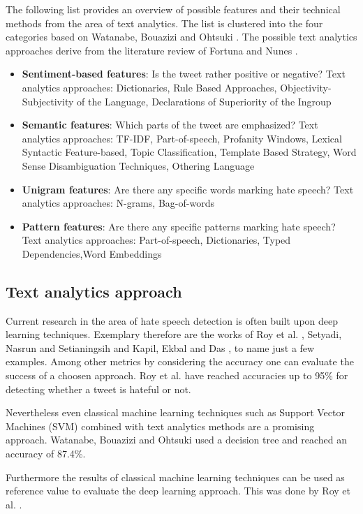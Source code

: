 The following list provides an overview of possible features and their technical methods from the area of text analytics. The list is clustered into the four categories based on Watanabe, Bouazizi and Ohtsuki \cite{Watanabe.2018}. The possible text analytics approaches derive from the literature review of Fortuna and Nunes \cite{Fortuna.2018}.
\begin{itemize}
	\item \textbf{Sentiment-based features}: Is the tweet rather positive or negative? \newline
	Text analytics approaches: Dictionaries, Rule Based Approaches, Ob\-jec\-ti\-vi\-ty-Subjectivity of the Language, Declarations of Superiority of the Ingroup \cite{Fortuna.2018}
	\item \textbf{Semantic features}: Which parts of the tweet are emphasized? \newline
	Text analytics approaches: TF-IDF, Part-of-speech, Profanity Windows, Lexical Syntactic Feature-based, Topic Classification, Template Based Strategy, Word Sense Disambiguation Techniques, Othering Language \cite{Fortuna.2018}
	\item \textbf{Unigram features}: Are there any specific words marking hate speech? \newline
	Text analytics approaches: N-grams, Bag-of-words \cite{Fortuna.2018}
	\item \textbf{Pattern features}: Are there any specific patterns marking hate speech? \newline
	Text analytics approaches: Part-of-speech, Dictionaries, Typed De\-pen\-den\-cies,Word Embeddings \cite{Fortuna.2018}
\end{itemize}


\subsection{Text analytics approach}

Current research in the area of hate speech detection is often built upon deep learning techniques. Exemplary therefore are the works of Roy et al. \cite{Roy.2020}, Setyadi, Nasrun and Setianingsih \cite{NabiilaAdaniSetyadi.2018} and Kapil, Ekbal and Das \cite{Kapil.2020}, to name just a few examples. Among other metrics by considering the accuracy one can evaluate the success of a choosen approach. Roy et al. \cite{Roy.2020} have reached accuracies up to 95\% for detecting whether a tweet is hateful or not.

Nevertheless even classical machine learning techniques such as Support Vector Machines (SVM) combined with text analytics methods are a promis\-ing approach.
Watanabe, Bouazizi and Ohtsuki \cite{Watanabe.2018} used a decision tree and reached an accuracy of 87.4\%.


Furthermore the results of classical machine learning techniques can be used as reference value to evaluate the deep learning approach. This was done by Roy et al. \cite{Roy.2020}.
